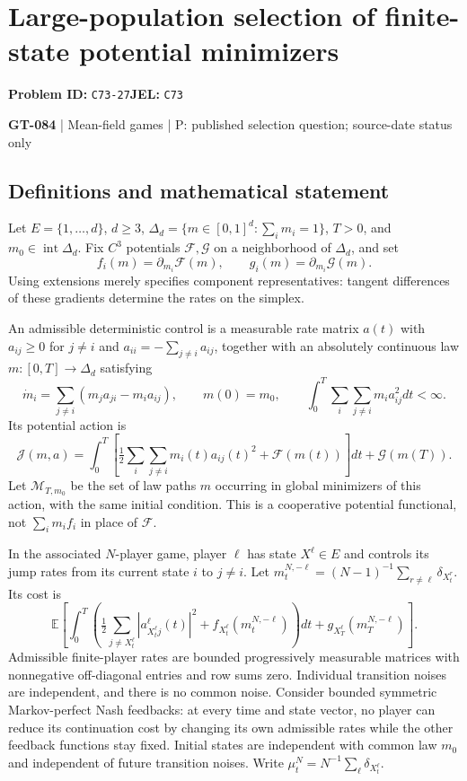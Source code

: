\documentclass[11pt,a4paper]{article}
\begin{document}
\section*{Large-population selection of finite-state potential minimizers}
\textbf{Problem ID:} \texttt{C73-27}\quad \textbf{JEL:} \texttt{C73}\par
\label{problem:OP-0214}
\label{game:GT-084}
{\sffamily\small\color{muted}
{\small\textbf{GT-084} | Mean-field games | P: published selection question; source-date status only\par}
\par}
\subsection*{Definitions and mathematical statement}
Let $E=\{1,\ldots,d\}$, $d\geq3$, $\Delta_d=\{m\in[0,1]^d:\sum_i m_i=1\}$, $T>0$, and $m_0\in\operatorname{int}\Delta_d$. Fix $C^3$ potentials $\mathcal F,\mathcal G$ on a neighborhood of $\Delta_d$, and set
\[
 f_i(m)=\partial_{m_i}\mathcal F(m),\qquad
 g_i(m)=\partial_{m_i}\mathcal G(m).
\]
Using extensions merely specifies component representatives: tangent differences of these gradients determine the rates on the simplex.

An admissible deterministic control is a measurable rate matrix $a(t)$ with $a_{ij}\geq0$ for $j\ne i$ and $a_{ii}=-\sum_{j\ne i}a_{ij}$, together with an absolutely continuous law $m:[0,T]\to\Delta_d$ satisfying
\[
 \dot m_i=\sum_{j\ne i}(m_j a_{ji}-m_i a_{ij}),\qquad m(0)=m_0,
 \qquad
 \int_0^T\sum_{i}\sum_{j\ne i}m_i a_{ij}^2dt<\infty.
\]
Its potential action is
\[
 \mathcal J(m,a)=\int_0^T\left[
 \tfrac12\sum_i\sum_{j\ne i}m_i(t)a_{ij}(t)^2+\mathcal F(m(t))\right]dt
 +\mathcal G(m(T)).
\]
Let $\mathcal M_{T,m_0}$ be the set of law paths $m$ occurring in global minimizers of this action, with the same initial condition. This is a cooperative potential functional, not $\sum_i m_if_i$ in place of $\mathcal F$.

In the associated $N$-player game, player $\ell$ has state $X^\ell\in E$ and controls its jump rates from its current state $i$ to $j\ne i$. Let $m_t^{N,-\ell}=(N-1)^{-1}\sum_{r\ne\ell}\delta_{X_t^r}$. Its cost is
\[
 \mathbb E\!\left[\int_0^T\left(
 \tfrac12\sum_{j\ne X_t^\ell}|a_{X_t^\ell j}^{\ell}(t)|^2
 +f_{X_t^\ell}(m_t^{N,-\ell})\right)dt
 +g_{X_T^\ell}(m_T^{N,-\ell})\right].
\]
Admissible finite-player rates are bounded progressively measurable matrices with nonnegative off-diagonal entries and row sums zero. Individual transition noises are independent, and there is no common noise. Consider bounded symmetric Markov-perfect Nash feedbacks: at every time and state vector, no player can reduce its continuation cost by changing its own admissible rates while the other feedback functions stay fixed. Initial states are independent with common law $m_0$ and independent of future transition noises. Write $\mu_t^N=N^{-1}\sum_\ell\delta_{X_t^\ell}$.
\end{document}
